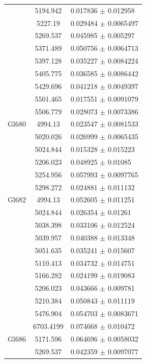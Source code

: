 \begin{longtable}{|c|c|l|}
 & 5194.942 & 0.017836 $\pm$ 0.012958 \\        
 & 5227.19 & 0.029484 $\pm$ 0.0065497 \\        
 & 5269.537 & 0.045985 $\pm$ 0.005297 \\        
 & 5371.489 & 0.050756 $\pm$ 0.0064713 \\       
 & 5397.128 & 0.035227 $\pm$ 0.0084224 \\       
 & 5405.775 & 0.036585 $\pm$ 0.0086442 \\       
 & 5429.696 & 0.041218 $\pm$ 0.0049397 \\       
 & 5501.465 & 0.017551 $\pm$ 0.0091079 \\       
 & 5506.779 & 0.028073 $\pm$ 0.0073386 \\       
\hline                                          
Gl680 & 4994.13 & 0.023547 $\pm$ 0.0081533 \\   
 & 5020.026 & 0.026999 $\pm$ 0.0065435 \\       
 & 5024.844 & 0.015328 $\pm$ 0.015223 \\        
 & 5206.023 & 0.048925 $\pm$ 0.01085 \\         
 & 5254.956 & 0.057993 $\pm$ 0.0097765 \\       
 & 5298.272 & 0.024881 $\pm$ 0.011132 \\        
\hline                                          
Gl682 & 4994.13 & 0.052605 $\pm$ 0.011251 \\    
 & 5024.844 & 0.026354 $\pm$ 0.01261 \\         
 & 5038.398 & 0.033106 $\pm$ 0.012524 \\        
 & 5039.957 & 0.040388 $\pm$ 0.013348 \\        
 & 5051.635 & 0.035241 $\pm$ 0.015607 \\        
 & 5110.413 & 0.034732 $\pm$ 0.014751 \\        
 & 5166.282 & 0.024199 $\pm$ 0.019083 \\        
 & 5206.023 & 0.043666 $\pm$ 0.009781 \\        
 & 5210.384 & 0.050843 $\pm$ 0.011119 \\        
 & 5476.904 & 0.054703 $\pm$ 0.0083671 \\       
 & 6703.4199 & 0.074668 $\pm$ 0.010472 \\       
\hline                                          
Gl686 & 5171.596 & 0.064696 $\pm$ 0.0058032 \\  
 & 5269.537 & 0.042359 $\pm$ 0.0097077 \\       

\end{longtable}
